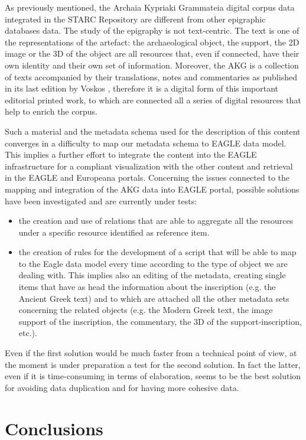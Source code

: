 \documentclass[amsthm,ebook]{saparticle}
\begin{document}
As previously mentioned, the Archaia Kypriaki Grammateia digital corpus data integrated in the STARC Repository are
different from other epigraphic databases data. The study of the epigraphy is not text-centric. The text is one of the
representations of the artefact: the archaeological object, the support, the 2D image or the 3D of the object are all
resources that, even if connected, have their own identity and their own set of information. Moreover, the AKG is a
collection of texts accompanied by their translations, notes and commentaries as published in its last edition by
Voskos \citep{voskos__1997}, therefore it is a digital form of this important editorial printed work, to which are connected
all a series of digital resources that help to enrich the corpus.

Such a material and the metadata schema used for the description of this content converges in a difficulty to map our
metadata schema to EAGLE data model. This implies a further effort to integrate the content into the EAGLE
infrastructure for a compliant visualization with the other content and retrieval in the EAGLE and Europeana portals.
Concerning the issues connected to the mapping and integration of the AKG data into EAGLE portal, possible solutions
have been investigated and are currently under tests:

\begin{itemize}
\item the creation and use of relations that are able to aggregate all the resources under a specific resource
identified as reference item.
\item the creation of rules for the development of a script that will be able to map to the Eagle data model every time
according to the type of object we are dealing with. This implies also an editing of the metadata, creating single
items that have as head the information about the inscription (e.g. the Ancient Greek text) and to which are attached
all the other metadata sets concerning the related objects (e.g. the Modern Greek text, the image support of the
inscription, the commentary, the 3D of the support-inscription, etc.).
\end{itemize}
Even if the first solution would be much faster from a technical point of view, at the moment is under preparation a
test for the second solution. In fact the latter, even if it is time-consuming in terms of elaboration, seems to be the
best solution for avoiding data duplication and for having more cohesive data. 

\section{Conclusions}
\end{document}
